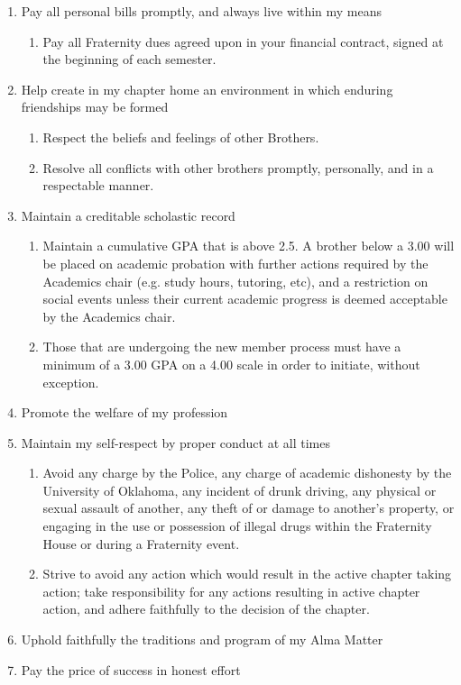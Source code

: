 \documentclass{article}
\begin{document}
\begin{enumerate}
    \item Pay all personal bills promptly, and always live within my means
    \begin{enumerate}
        \item Pay all Fraternity dues agreed upon in your financial contract, signed at the beginning of each semester.
    \end{enumerate}
    \item Help create in my chapter home an environment in which enduring friendships may be formed
    \begin{enumerate}
        \item Respect the beliefs and feelings of other Brothers.
        \item Resolve all conflicts with other brothers promptly, personally, and in a respectable manner.
    \end{enumerate}
    \item Maintain a creditable scholastic record
    \begin{enumerate}
        \item Maintain a cumulative GPA that is above 2.5. A brother below a 3.00 will be placed on academic probation with further actions required by the Academics chair (e.g. study hours, tutoring, etc), and a restriction on social events unless their current academic progress is deemed acceptable by the Academics chair.
        \item Those that are undergoing the new member process must have a minimum of a 3.00 GPA on a 4.00 scale in order to initiate, without exception.
    \end{enumerate}
    \item Promote the welfare of my profession
    \item Maintain my self-respect by proper conduct at all times
    \begin{enumerate}
        \item Avoid any charge by the Police, any charge of academic dishonesty by the University of Oklahoma, any incident of drunk driving, any physical or sexual assault of another, any theft of or damage to another’s property, or engaging in the use or possession of illegal drugs within the Fraternity House or during a Fraternity event.
        \item Strive to avoid any action which would result in the active chapter taking action; take responsibility for any actions resulting in active chapter action, and adhere faithfully to the decision of the chapter.
    \end{enumerate}
    \item Uphold faithfully the traditions and program of my Alma Matter
    \item Pay the price of success in honest effort
\end{enumerate}
\end{document}
